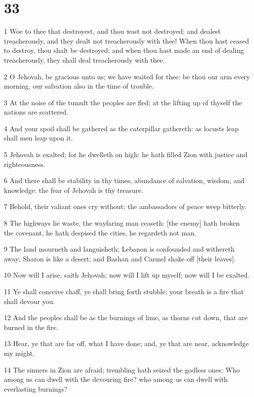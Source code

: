 \chapter{33}

\par 1 Woe to thee that destroyest, and thou wast not destroyed; and dealest treacherously, and they dealt not treacherously with thee! When thou hast ceased to destroy, thou shalt be destroyed; and when thou hast made an end of dealing treacherously, they shall deal treacherously with thee.
\par 2 O Jehovah, be gracious unto us; we have waited for thee: be thou our arm every morning, our salvation also in the time of trouble.
\par 3 At the noise of the tumult the peoples are fled; at the lifting up of thyself the nations are scattered.
\par 4 And your spoil shall be gathered as the caterpillar gathereth: as locusts leap shall men leap upon it.
\par 5 Jehovah is exalted; for he dwelleth on high: he hath filled Zion with justice and righteousness.
\par 6 And there shall be stability in thy times, abundance of salvation, wisdom, and knowledge: the fear of Jehovah is thy treasure.
\par 7 Behold, their valiant ones cry without; the ambassadors of peace weep bitterly.
\par 8 The highways lie waste, the wayfaring man ceaseth: [the enemy] hath broken the covenant, he hath despised the cities, he regardeth not man.
\par 9 The land mourneth and languisheth; Lebanon is confounded and withereth away; Sharon is like a desert; and Bashan and Carmel shake off [their leaves].
\par 10 Now will I arise, saith Jehovah; now will I lift up myself; now will I be exalted.
\par 11 Ye shall conceive chaff, ye shall bring forth stubble: your breath is a fire that shall devour you.
\par 12 And the peoples shall be as the burnings of lime, as thorns cut down, that are burned in the fire.
\par 13 Hear, ye that are far off, what I have done; and, ye that are near, acknowledge my might.
\par 14 The sinners in Zion are afraid; trembling hath seized the godless ones: Who among us can dwell with the devouring fire? who among us can dwell with everlasting burnings?
